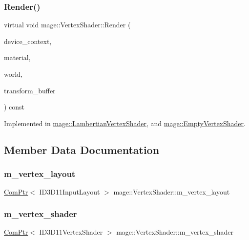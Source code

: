 \subsubsection{\texorpdfstring{Render()}{Render()}}
{\footnotesize\ttfamily virtual void mage\+::\+Vertex\+Shader\+::\+Render (\begin{DoxyParamCaption}\item[{I\+D3\+D11\+Device\+Context2 \&}]{device\+\_\+context,  }\item[{const \hyperlink{structmage_1_1_material}{Material} \&}]{material,  }\item[{const \hyperlink{classmage_1_1_world}{World} \&}]{world,  }\item[{const \hyperlink{structmage_1_1_transform_buffer}{Transform\+Buffer} \&}]{transform\+\_\+buffer }\end{DoxyParamCaption}) const\hspace{0.3cm}{\ttfamily [pure virtual]}}



Implemented in \hyperlink{classmage_1_1_lambertian_vertex_shader_a78571908e61d9a93f834c2e9354c1d9b}{mage\+::\+Lambertian\+Vertex\+Shader}, and \hyperlink{classmage_1_1_empty_vertex_shader_add33145cec721952a388aaef179fb03b}{mage\+::\+Empty\+Vertex\+Shader}.



\subsection{Member Data Documentation}
\hypertarget{classmage_1_1_vertex_shader_a9b9895650b8c7f80af846d75f7d9ddda}{}\label{classmage_1_1_vertex_shader_a9b9895650b8c7f80af846d75f7d9ddda} 
\subsubsection{\texorpdfstring{m\+\_\+vertex\+\_\+layout}{m\_vertex\_layout}}
{\footnotesize\ttfamily \hyperlink{namespacemage_ae74f374780900893caa5555d1031fd79}{Com\+Ptr}$<$ I\+D3\+D11\+Input\+Layout $>$ mage\+::\+Vertex\+Shader\+::m\+\_\+vertex\+\_\+layout\hspace{0.3cm}{\ttfamily [protected]}}

\hypertarget{classmage_1_1_vertex_shader_a0b2b02abae4cb226c115d7f1c5464a54}{}\label{classmage_1_1_vertex_shader_a0b2b02abae4cb226c115d7f1c5464a54} 
\subsubsection{\texorpdfstring{m\+\_\+vertex\+\_\+shader}{m\_vertex\_shader}}
{\footnotesize\ttfamily \hyperlink{namespacemage_ae74f374780900893caa5555d1031fd79}{Com\+Ptr}$<$ I\+D3\+D11\+Vertex\+Shader $>$ mage\+::\+Vertex\+Shader\+::m\+\_\+vertex\+\_\+shader\hspace{0.3cm}{\ttfamily [protected]}}

